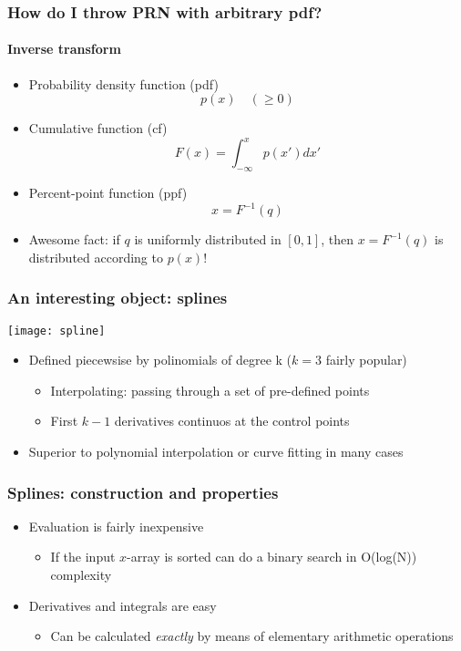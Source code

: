 \documentclass[9pt]{beamer}
\begin{document}
\begin{frame}
  \frametitle{How do I throw PRN with arbitrary pdf?}
  \framesubtitle{Inverse transform}
  \begin{itemize}
  \item Probability density function (pdf)
    $$
    p(x) \quad (\ge 0)
    $$
  \item Cumulative function (cf)
    $$
    F(x) = \int_{-\infty}^{x} p(x') dx'
    $$
  \item Percent-point function (ppf)
    $$
    x = F^{-1}(q)
    $$
  \item \alert{Awesome fact: if $q$ is uniformly distributed in $[0, 1]$,
    then $x = F^{-1}(q)$ is distributed according to $p(x)$!}
  \end{itemize}
\end{frame}


\begin{frame}
  \frametitle{An interesting object: splines}
  \centering\texttt{[image: spline]}

  \begin{itemize}
  \item Defined piecewsise by polinomials of degree k ($k = 3$ fairly popular)
    \begin{itemize}
    \item Interpolating: passing through a set of pre-defined points
    \item First $k-1$ derivatives continuos at the control points
    \end{itemize}
  \item Superior to polynomial interpolation or curve fitting in many cases
  \end{itemize}
\end{frame}


\begin{frame}
  \frametitle{Splines: construction and properties}
  
  
  \begin{itemize}
  \item Evaluation is fairly inexpensive
    \begin{itemize}
    \item If the input $x$-array is sorted can do a binary search in
      \alert{O(log(N)) complexity}
    \end{itemize}
  \item Derivatives and integrals are easy
    \begin{itemize}
    \item Can be calculated \emph{exactly} by means of elementary
      arithmetic operations
    \end{itemize}
  \end{itemize}
\end{frame}
\end{document}
